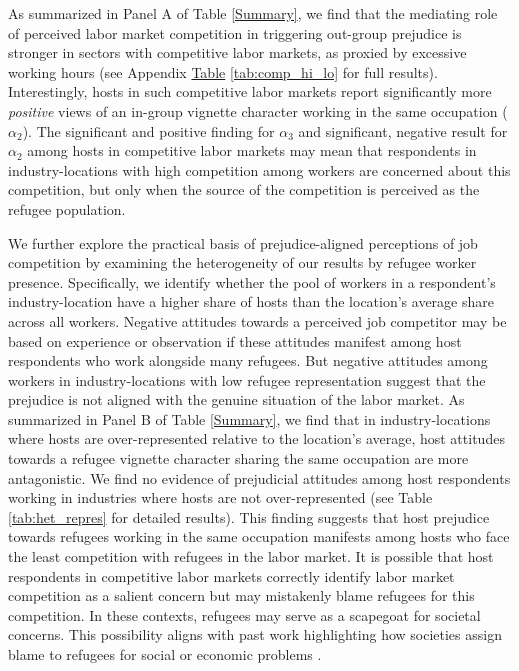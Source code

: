 \documentclass[a4paper,12pt]{article}
\begin{document}
\onehalfspacing As summarized in Panel A of Table \ref{Summary}, we find that the mediating role of perceived labor market competition in triggering out-group prejudice is stronger in sectors with competitive labor markets, as proxied by excessive working hours (see Appendix \hyperref[tab:comp_hi_lo]{Table} \ref{tab:comp_hi_lo} for full results). Interestingly, hosts in such competitive labor markets report significantly more \textit{positive} views of an in-group vignette character working in the same occupation ($\alpha_2$). The significant and positive finding for $\alpha_3$ and significant, negative result for $\alpha_2$ among hosts in competitive labor markets may mean that respondents in industry-locations with high competition among workers are concerned about this competition, but only when the source of the competition is perceived as the refugee population.

We further explore the practical basis of prejudice-aligned perceptions of job competition by examining the heterogeneity of our results by refugee worker presence. Specifically, we identify whether the pool of workers in a respondent's industry-location have a higher share of hosts than the location's average share across all workers. Negative attitudes towards a perceived job competitor may be based on experience or observation if these attitudes manifest among host respondents who work alongside many refugees. But negative attitudes among workers in industry-locations with low refugee representation suggest that the prejudice is not aligned with the genuine situation of the labor market. As summarized in Panel B of Table \ref{Summary}, we find that in industry-locations where hosts are over-represented relative to the location's average, host attitudes towards a refugee vignette character sharing the same occupation are more antagonistic. We find no evidence of prejudicial attitudes  among host respondents working in industries where hosts are not over-represented (see Table \ref{tab:het_repres} for detailed results). This finding suggests that host prejudice towards refugees working in the same occupation manifests among hosts who face the least competition with refugees in the labor market. It is possible that host respondents in competitive labor markets correctly identify labor market competition as a salient concern but may mistakenly blame refugees for this competition. In these contexts, refugees may serve as a scapegoat for societal concerns. This possibility aligns with past work highlighting how societies assign blame to refugees for social or economic problems \citep{baylouny2020, savun2019protection, hanson2010out}.
\end{document}

